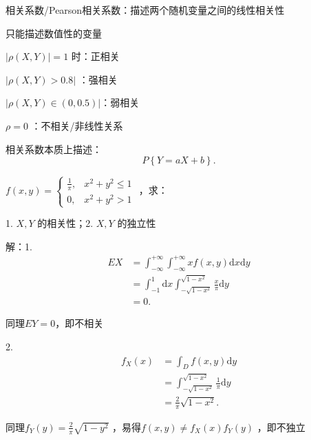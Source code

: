 \begin{notation}
    相关系数/Pearson相关系数：描述两个随机变量之间的线性相关性

    只能描述数值性的变量
\end{notation}
$|\rho\left( X,Y \right)|=1 $ 时：正相关

$\left| \rho\left( X,Y \right) >0.8 \right| $ ：强相关

$\left| \rho\left( X,Y \right) \in \left( 0,0.5 \right)  \right| $：弱相关

$\rho=0$ ：不相关/非线性关系
\begin{notation}
    相关系数本质上描述：
    \[
        P\left\{ Y=aX+b \right\} 
    .\] 
\end{notation}
\begin{eg}
    $f\left( x,y \right) =\begin{cases}
        \frac{1}{\pi} ,&x^2+y^2\le 1\\
        0,&x^2+y^2>1
    \end{cases}$ ，求：

    1. $X,Y$ 的相关性；2. $X,Y$ 的独立性
\end{eg}
解：1. 
\begin{align*}
    EX&=\int_{-\infty}^{+\infty} \int_{-\infty}^{+\infty} xf\left( x,y \right)  \mathrm{d}x \mathrm{d}y\\
    &= \int_{-1}^{1}  \mathrm{d}x \int_{-\sqrt{1-x^2} }^{\sqrt{1-x^2} } \frac{x}{\pi}  \mathrm{d}y \\
    &= 0
.\end{align*}

同理$EY=0$，即不相关

2. 
\begin{align*}
    f_X\left( x \right) &= \int_{D}^{} f\left( x,y \right)  \mathrm{d}y \\
    &=\int_{-\sqrt{1-x^2} }^{\sqrt{1-x^2} } \frac{1}{\pi}  \mathrm{d}y\\
                        &=\frac{2}{\pi} \sqrt{1-x^2} 
.\end{align*}

同理$f_Y\left( y \right) ={\frac{2}{\pi} \sqrt{1-y^2}}$ ，易得$f\left( x,y \right) \neq f_X\left( x \right) f_Y\left( y \right) $ ，即不独立

{}
